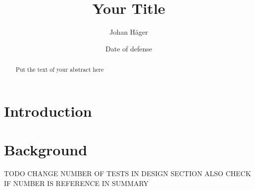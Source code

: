 \documentclass[12pt,twoside]{kau_report}
\title{Your Title}
\author{Johan H\"{a}ger}
\date{Date of defense}
\begin{document}
\makekautitle

\copyrightpage

\begin{frontmatter}

\approved

\begin{abstract}
Put the text of your abstract here
\end{abstract}





  \tableofcontents

  \listoffigures

  \listoftables
  
  \lstlistoflistings

\end{frontmatter}

\section{Introduction}
\label{sec:introduction}

\cleardoublepage

\section{Background}
\label{sec:background}

\cleardoublepage
TODO CHANGE NUMBER OF TESTS IN DESIGN SECTION ALSO CHECK IF NUMBER IS REFERENCE IN SUMMARY
\end{document}
